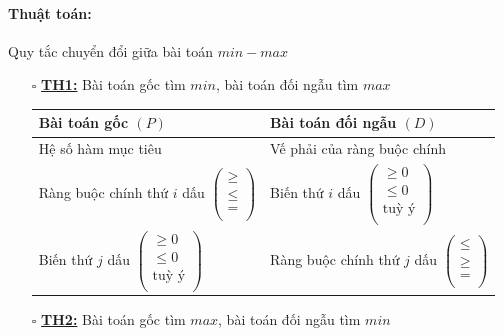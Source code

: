 \documentclass{article}
\begin{document}
\paragraph{Thuật toán:}
\begin{flushleft}
    \hspace{0.4cm} Quy tắc chuyển đổi giữa bài toán $min - max$
\end{flushleft}
\begin{itemize}
    \item [$\square$] \textbf{\underline{TH1:}} Bài toán gốc tìm $min$, bài toán đối ngẫu tìm $max$
    \begin{table}[!ht]
        \centering
        \begin{tabular}{|w{c}{6cm}|w{c}{6cm}|}
        \hline
            Bài toán gốc $(P)$ & Bài toán đối ngẫu $(D)$ \\ \hline
            Hệ số hàm mục tiêu & Vế phải của ràng buộc chính \\ \hline
            Ràng buộc chính thứ $i$ dấu $\left(\begin{array}{l} \geq \\ \leq \\= \\ \end{array}\right)$ & Biến thứ $i$ dấu $\left(\begin{array}{l} \geq 0 \\ \leq 0 \\ \text{tuỳ ý} \\ \end{array}\right)$ \\ \hline
            Biến thứ $j$ dấu $\left(\begin{array}{l} \geq 0 \\ \leq 0 \\ \text{tuỳ ý} \\ \end{array}\right)$ & Ràng buộc chính thứ $j$ dấu $\left(\begin{array}{l} \leq \\ \geq \\= \\ \end{array}\right)$ \\ \hline
        \end{tabular}
    \end{table}
    \item [$\square$] \textbf{\underline{TH2:}} Bài toán gốc tìm $max$, bài toán đối ngẫu tìm $min$
    \begin{table}[!ht]

\end{table}
\end{itemize}
\end{document}
